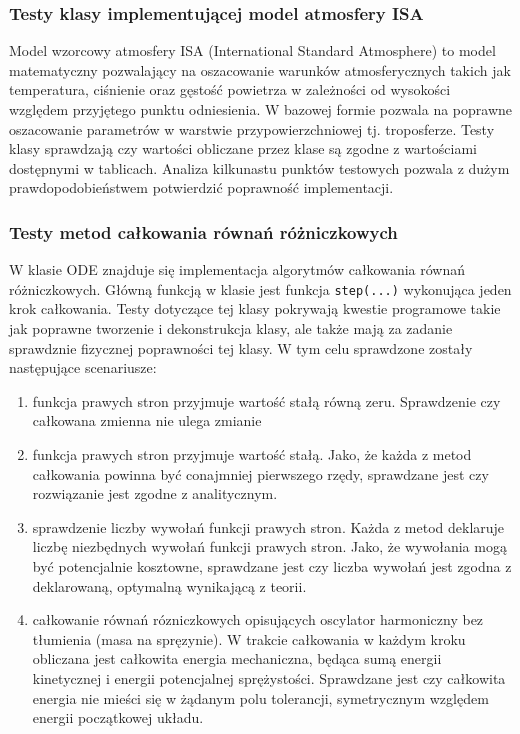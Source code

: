\documentclass[15pt]{sprawozdanie}
\begin{document}
\subsubsection{Testy klasy implementującej model atmosfery ISA}

Model wzorcowy atmosfery ISA (International Standard Atmosphere) to model matematyczny pozwalający na oszacowanie warunków atmosferycznych takich jak temperatura, ciśnienie oraz gęstość powietrza w zależności od wysokości względem przyjętego punktu odniesienia. W bazowej formie pozwala na poprawne oszacowanie parametrów w warstwie przypowierzchniowej tj. troposferze. Testy klasy sprawdzają czy wartości obliczane przez klase są zgodne z wartościami dostępnymi w tablicach. Analiza kilkunastu punktów testowych pozwala z dużym prawdopodobieństwem potwierdzić poprawność implementacji.

\subsubsection{Testy metod całkowania równań różniczkowych}

W klasie ODE znajduje się implementacja algorytmów całkowania równań różniczkowych. Główną funkcją w klasie jest funkcja \texttt{step(...)} wykonująca jeden krok całkowania. Testy dotyczące tej klasy pokrywają kwestie programowe takie jak poprawne tworzenie i dekonstrukcja klasy, ale także mają za zadanie sprawdznie fizycznej poprawności tej klasy. W tym celu sprawdzone zostały następujące scenariusze:

\begin{enumerate}
\item funkcja prawych stron przyjmuje wartość stałą równą zeru. Sprawdzenie czy całkowana zmienna nie ulega zmianie
\item funkcja prawych stron przyjmuje wartość stałą. Jako, że każda z metod całkowania powinna być conajmniej pierwszego rzędy, sprawdzane jest czy rozwiązanie jest zgodne z analitycznym.
\item sprawdzenie liczby wywołań funkcji prawych stron. Każda z metod deklaruje liczbę niezbędnych wywołań funkcji prawych stron. Jako, że wywołania mogą być potencjalnie kosztowne, sprawdzane jest czy liczba wywołań jest zgodna z deklarowaną, optymalną wynikającą z teorii.
\item całkowanie równań rózniczkowych opisujących oscylator harmoniczny bez tłumienia (masa na spręzynie). W trakcie całkowania w każdym kroku obliczana jest całkowita energia mechaniczna, będąca sumą energii kinetycznej i energii potencjalnej sprężystości. Sprawdzane jest czy całkowita energia nie mieści się w żądanym polu tolerancji, symetrycznym względem energii początkowej układu.
\end{enumerate}
 
\end{document}
